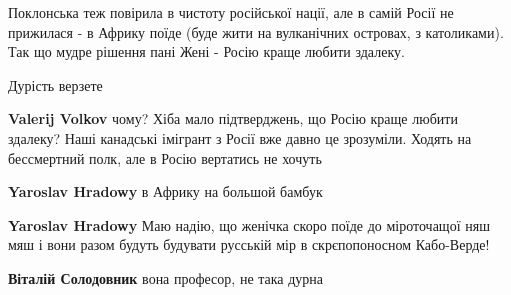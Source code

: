 \begin{itemize}
Поклонська теж повірила в чистоту російської нації, але в самій Росії не
прижилася - в Африку поїде (буде жити на вулканічних островах, з католиками).
Так що мудре рішення пані Жені - Росію краще любити здалеку.

\begin{itemize}
 
Дурість верзете

 
\textbf{Valerij Volkov} чому? Хіба мало підтверджень, що Росію краще любити здалеку? Наші канадські імігрант з Росії вже давно це зрозуміли. Ходять на бессмертний полк, але в Росію вертатись не хочуть

 
\textbf{Yaroslav Hradowy} в Африку на большой бамбук

 
\textbf{Yaroslav Hradowy} Маю надію, що женічка скоро поїде до міроточащої няш мяш і вони разом будуть будувати русській мір в скрєпопоносном Кабо-Верде!

 
\textbf{Віталій Солодовник} вона професор, не така дурна
\end{itemize}



\end{itemize}
